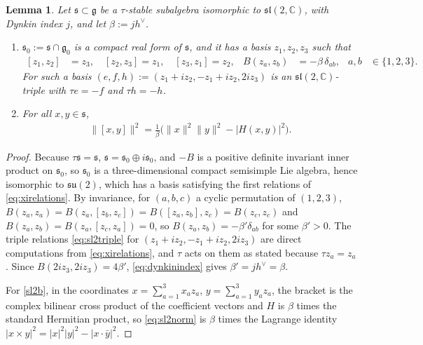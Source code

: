\documentclass[leqno,10pt]{amsart}
\newtheorem{lemma}[theorem]{Lemma}%
\theoremstyle{definition}
\numberwithin{equation}{section}
\newcommand{\su}{\mathfrak{su}}
\newcommand{\sll}{\mathfrak{sl}}
\newcommand{\g}{\mathfrak{g}}
\newcommand{\com}{\mathbb C}
\newcommand{\gz}{\g_{0}}
\newcommand{\hv}{h^\vee}
\newcommand{\norm}[1]{\lVert #1\rVert}
\newcommand{\subs}{\mathfrak{s}}
\begin{document}
\begin{lemma}\label{lem:sl2str}
Let $\subs\subset\g$ be a $\tau$-stable subalgebra isomorphic to $\sll(2, \com)$, with Dynkin index $j$, and let $\beta := j\hv$.
\begin{enumerate}[label=(\arabic*), ref=(\arabic*)]
\item\label{sl2a} $\subs_0:=\subs\cap\gz$ is a compact real form of $\subs$, and it has a basis $z_1,z_2,z_3$ such that
\begin{align}\label{eq:xirelations}
[z_{1}, z_{2}] &= z_{3}, \quad [z_{2}, z_{3}] = z_{1}, \quad [z_{3}, z_{1}] = z_{2}, & B(z_a,z_b) &= -\beta\,\delta_{ab}, & a, b &\in \{1, 2, 3\}.
\end{align}
For such a basis $(e, f, h) := (z_{1} + iz_{2}, -z_{1} + iz_{2}, 2iz_{3})$ is an $\sll(2, \com)$-triple with $\tau e = -f$ and $\tau h = -h$.
\item\label{sl2b} For all $x, y \in \subs$,
\begin{align}\label{eq:sl2norm}
\norm{[x,y]}^2 = \frac{1}{\beta}\Big(\norm{x}^{2}\norm{y}^{2} - |H(x, y)|^{2}\Big).
\end{align}
\end{enumerate}
\end{lemma}

\begin{proof}
Because $\tau\subs = \subs$, $\subs = \subs_{0} \oplus i\subs_{0}$, and $-B$ is a positive definite invariant inner product on $\subs_{0}$, so $\subs_{0}$ is a three-dimensional compact semisimple Lie algebra, hence isomorphic to $\su(2)$, which has a basis satisfying the first relations of \eqref{eq:xirelations}. By invariance, for $(a, b, c)$ a cyclic permutation of $(1, 2, 3)$, $B(z_{a}, z_{a}) = B(z_{a}, [z_{b}, z_{c}]) = B([z_{a}, z_{b}], z_{c}) = B(z_{c}, z_{c})$ and $B(z_{a}, z_{b}) = B(z_{a}, [z_{c}, z_{a}]) = 0$, so $B(z_{a}, z_{b}) = -\beta'\delta_{ab}$ for some $\beta' > 0$. The triple relations \eqref{eq:sl2triple} for $(z_{1} + iz_{2}, -z_{1} + iz_{2}, 2iz_{3})$ are direct computations from \eqref{eq:xirelations}, and $\tau$ acts on them as stated because $\tau z_{a} = z_{a}$. Since $B(2iz_{3}, 2iz_{3}) = 4\beta'$, \eqref{eq:dynkinindex} gives $\beta' = j\hv = \beta$.

For \ref{sl2b}, in the coordinates $x = \sum_{a=1}^{3}x_{a}z_{a}$, $y = \sum_{a=1}^{3}y_{a}z_{a}$, the bracket is the complex bilinear cross product of the coefficient vectors and $H$ is $\beta$ times the standard Hermitian product, so \eqref{eq:sl2norm} is $\beta$ times the Lagrange identity $|x \times y|^{2} = |x|^{2}|y|^{2} - |x \cdot \bar{y}|^{2}$.
\end{proof}
\end{document}
